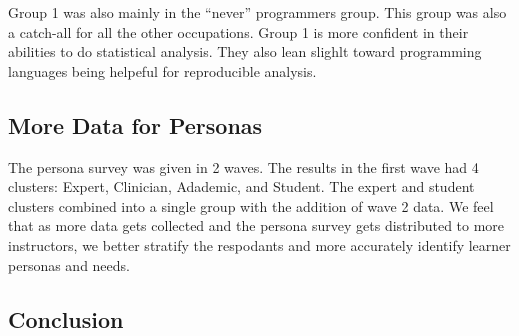 \documentclass[020-persona_validation.tex]{subfiles}
\begin{document}
            Group 1 was also mainly in the ``never'' programmers group.
            This group was also a catch-all for all the other occupations.
            Group 1 is more confident in their abilities to do statistical analysis.
            They also lean slighlt toward programming languages being helpeful for reproducible analysis.

    \subsection{More Data for Personas}

        The persona survey was given in 2 waves.
        The results in the first wave had 4 clusters: Expert, Clinician, Adademic, and Student.
        The expert and student clusters combined into a single group with the addition of wave 2 data.
        We feel that as more data gets collected and the persona survey gets distributed to more
        instructors, we better stratify the respodants and more accurately identify learner personas and
        needs.

    \subsection{Conclusion}
\end{document}
